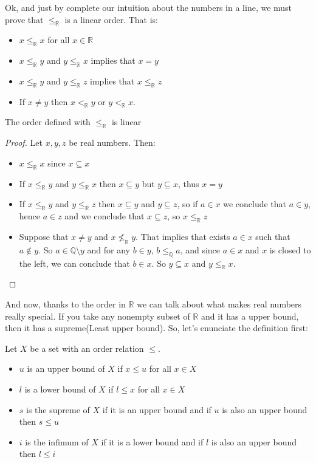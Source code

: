 \documentclass{tufte-handout}
\begin{document}
Ok, and just by complete our intuition about the numbers in a line, we must prove that $\le_\mathbb{R}$ is a linear order. That is:
\begin{itemize}
	\item $x \le_\mathbb{R} x$ for all $x \in \mathbb{R}$
	\item $x \le_\mathbb{R} y$ and $y \le_\mathbb{R} x$ implies that $x = y$
	\item $x \le_\mathbb{R} y$ and $y \le_\mathbb{R} z$ implies that $x \le_\mathbb{R} z$
	\item If $x \neq y$ then $x <_\mathbb{R} y$ or $y <_\mathbb{R} x$.
\end{itemize}
\begin{theorem}
	The order defined with $\le_\mathbb{R}$ is linear
\end{theorem}
\begin{proof}
	Let $x, y, z$ be real numbers. Then:
	\begin{itemize}
		\item $x \le_\mathbb{R} x$ since $x \subseteq x$
		\item If $x \le_\mathbb{R} y$ and $y \le_\mathbb{R} x$ then $x \subseteq y$ but $y \subseteq x$, thus $x = y$
		\item If $x \le_\mathbb{R} y$ and $y \le_\mathbb{R} z$ then $x \subseteq y$ and $y \subseteq z$, so if $a \in x$ we conclude that $a \in y$, hence $a \in z$ and we conclude that $x \subseteq z$, so $x \le_\mathbb{R} z$
		\item Suppose that $x \neq y$ and $x \not\le_{\mathbb{R}} y$. That implies that exists $a \in x$ such that $a \not \in y$. So $a \in \mathbb{Q} \setminus y$ and for any $b \in y$, $b \le_\mathbb{Q} a$, and since $a \in x$ and $x$ is closed to the left, we can conclude that $b \in x$. So $y \subseteq x$ and $y \le_\mathbb{R} x$.
	\end{itemize}
\end{proof}

And now, thanks to the order in $\mathbb{R}$ we can talk about what makes real numbers really special. If you take any nonempty subset of $\mathbb{R}$ and it has a upper bound, then it has a supreme(Least upper bound). So, let's enunciate the definition first:
\begin{definition}
	Let $X$ be a set with an order relation $\le$.
	\begin{itemize}
		\item $u$ is an upper bound of $X$ if $x \le u$ for all $x \in X$
		\item $l$ is a lower bound of $X$ if $l \le x$ for all $x \in X$
		\item $s$ is the supreme of $X$ if it is an upper bound and if $u$ is also an upper bound then $s \le u$
		\item $i$ is the infimum of $X$ if it is a lower bound and if $l$ is also an upper bound then $l \le i$
	\end{itemize}
\end{definition}
\end{document}
